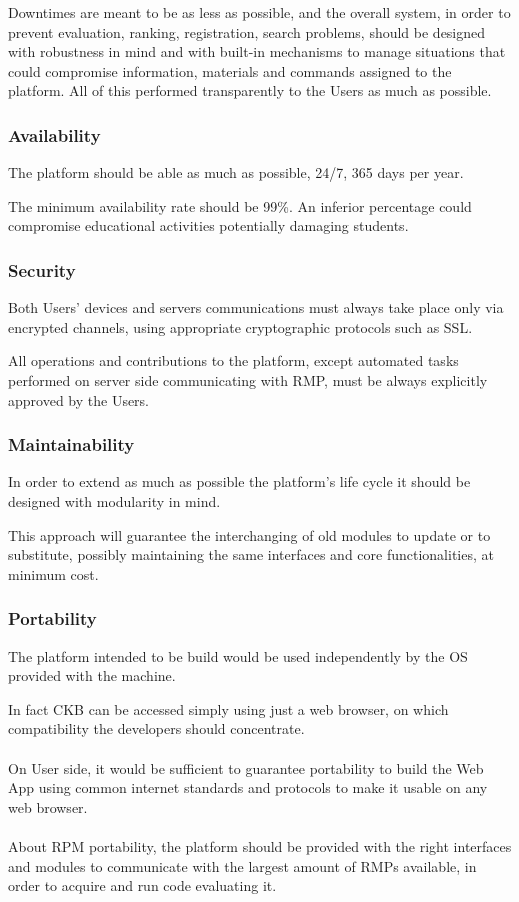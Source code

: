 Downtimes are meant to be as less as possible, and the overall system, in order to prevent evaluation, ranking, registration, search problems, should be designed with robustness in mind and with built-in mechanisms to manage situations 
that could compromise information, materials and commands assigned to the platform. All of this performed transparently to the Users as much as possible.

\subsubsection{Availability}
The platform should be able as much as possible, 24/7, 365 days per year. 

The minimum availability rate should be 99\%. An inferior percentage could compromise educational activities potentially damaging students.

\subsubsection{Security}
Both Users' devices and servers communications must always take place only via encrypted channels, using appropriate cryptographic protocols such as SSL. 

All operations and contributions to the platform, except automated tasks performed on server side communicating with RMP, must be always explicitly approved by the Users.

\subsubsection{Maintainability}
In order to extend as much as possible the platform's life cycle it should be designed with modularity in mind. 

This approach will guarantee the interchanging of old modules to update or to substitute, possibly maintaining the same interfaces and core functionalities, at minimum cost.

\subsubsection{Portability}
The platform intended to be build would be used independently by the OS provided with the machine. 

In fact CKB can be accessed simply using just a web browser, on which compatibility the developers should concentrate.\\ 
\\
On User side, it would be sufficient to guarantee portability to build the Web App using common internet standards and protocols to make it usable on any web browser.\\
\\
About RPM portability, the platform should be provided with the right interfaces and modules to communicate with the largest amount of RMPs available, in order to acquire and run code evaluating it.